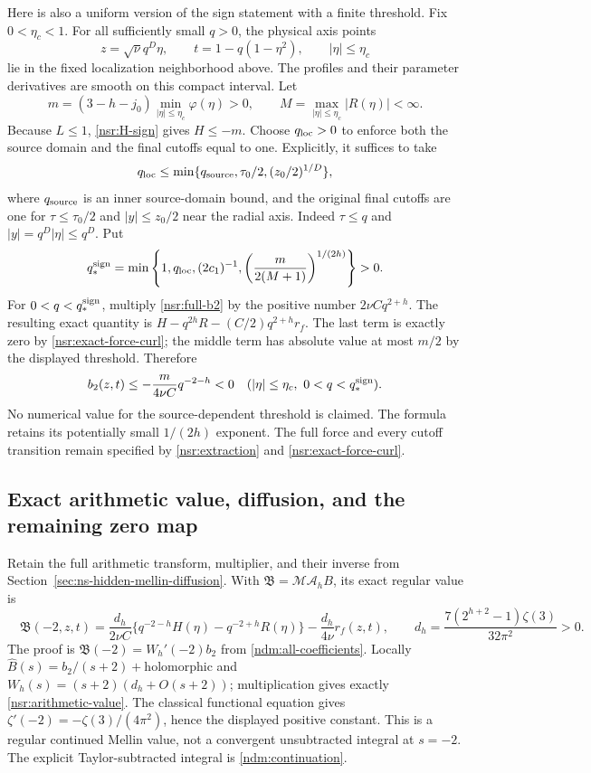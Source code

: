 Here is also a uniform version of the sign statement with a finite
threshold. Fix \(0<\eta_c<1\). For all sufficiently small \(q>0\),
the physical axis points
\[
 z=\sqrt\nu q^D\eta,\qquad t=1-q(1-\eta^2),\qquad |\eta|\leq\eta_c
\]
lie in the fixed localization neighborhood above. The profiles and
their parameter derivatives are smooth on this compact interval.
Let
\[
 m=(3-h-j_0)\min_{|\eta|\leq\eta_c}\varphi(\eta)>0,
 \qquad M=\max_{|\eta|\leq\eta_c}|R(\eta)|<\infty.
\]
Because \(L\leq1\), \eqref{nsr:H-sign} gives \(H\leq-m\).
Choose \(q_{\rm loc}>0\) to enforce both the source domain and
the final cutoffs equal to one. Explicitly, it suffices to take
\[
 q_{\rm loc}\leq\min\{q_{\rm source},\tau_0/2,(z_0/2)^{1/D}\},
\]
where \(q_{\rm source}\) is an inner source-domain bound, and
the original final cutoffs are one for \(\tau\leq\tau_0/2\)
and \(|y|\leq z_0/2\) near the radial axis. Indeed
\(\tau\leq q\) and \(|y|=q^D|\eta|\leq q^D\).
Put
\[
 q_*^{\rm sign}=\min\left\{1,q_{\rm loc},(2c_1)^{-1},
       \left(\frac{m}{2(M+1)}\right)^{1/(2h)}\right\}>0.
\]
For \(0<q<q_*^{\rm sign}\), multiply \eqref{nsr:full-b2} by
the positive number \(2\nu Cq^{2+h}\). The resulting exact
quantity is \(H-q^{2h}R-(C/2)q^{2+h}r_f\). The last term is
exactly zero by \eqref{nsr:exact-force-curl}; the middle term
has absolute value at most \(m/2\) by the displayed threshold.
Therefore
\begin{equation}\label{nsr:negative-bound}
 b_2(z,t)\leq-\frac{m}{4\nu C}q^{-2-h}<0
                 \quad(|\eta|\leq\eta_c,\ 0<q<q_*^{\rm sign}).
\end{equation}
No numerical value for the source-dependent threshold is claimed.
The formula retains its potentially small \(1/(2h)\) exponent.
The full force and every cutoff transition remain specified by
\eqref{nsr:extraction} and \eqref{nsr:exact-force-curl}.

\subsection{Exact arithmetic value, diffusion, and the remaining zero map}

Retain the full arithmetic transform, multiplier, and their inverse
from Section~\ref{sec:ns-hidden-mellin-diffusion}. With
\(\mathfrak B=\mathcal M\mathcal A_hB\), its exact regular value is
\begin{equation}\label{nsr:arithmetic-value}
 \boxed{\quad
 \mathfrak B(-2,z,t)
 =\frac{d_h}{2\nu C}
       \{q^{-2-h}H(\eta)-q^{-2+h}R(\eta)\}
                 -\frac{d_h}{4\nu}r_f(z,t),\qquad
 d_h=\frac{7(2^{h+2}-1)\zeta(3)}{32\pi^2}>0.
 \quad}
\end{equation}
The proof is \(\mathfrak B(-2)=W_h'(-2)b_2\) from
\eqref{ndm:all-coefficients}. Locally \(\widehat B(s)=
b_2/(s+2)+\text{holomorphic}\) and
\(W_h(s)=(s+2)(d_h+O(s+2))\); multiplication gives exactly
\eqref{nsr:arithmetic-value}. The classical functional equation
\cite[(25.4.2)]{apostolDLMF25} gives
\(\zeta'(-2)=-\zeta(3)/(4\pi^2)\), hence the displayed positive
constant. This is a regular continued Mellin value, not a convergent
unsubtracted integral at \(s=-2\). The explicit Taylor-subtracted
integral is \eqref{ndm:continuation}.

